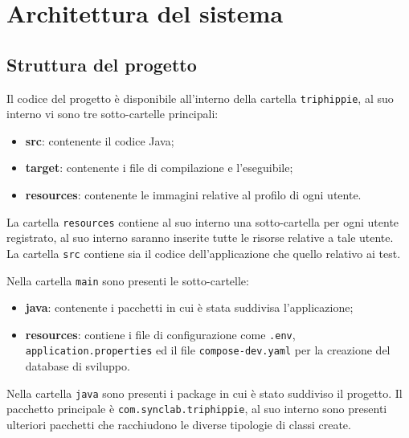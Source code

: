 \section{Architettura del sistema}

\subsection{Struttura del progetto}
Il codice del progetto è disponibile all'interno della cartella \texttt{triphippie}, al suo interno vi sono tre sotto-cartelle principali:
\begin{itemize}
    \item \textbf{src}: contenente il codice Java;
    \item \textbf{target}: contenente i file di compilazione e l'eseguibile;
    \item \textbf{resources}: contenente le immagini relative al profilo di ogni utente.
\end{itemize}
La cartella \texttt{resources} contiene al suo interno una sotto-cartella per ogni utente registrato, al suo interno saranno inserite tutte le risorse relative a tale utente.\\
La cartella \texttt{src} contiene sia il codice dell'applicazione che quello relativo ai test.

\begin{figure}[h]
    \centering
    \begin{minipage}{7cm}
    \end{minipage}
\end{figure}

\noindent
Nella cartella \texttt{main} sono presenti le sotto-cartelle:
\begin{itemize}
    \item \textbf{java}: contenente i pacchetti in cui è stata suddivisa l'applicazione;
    \item \textbf{resources}: contiene i file di configurazione come \texttt{.env}, \texttt{application.properties} ed il file \texttt{compose-dev.yaml} per la creazione del database di sviluppo.
\end{itemize} 
\begin{figure}[h]
    \centering
    \begin{minipage}{7cm}
    \end{minipage}
\end{figure}
\noindent
Nella cartella \texttt{java} sono presenti i package in cui è stato suddiviso il progetto.
Il pacchetto principale è \texttt{com.synclab.triphippie}, al suo interno sono presenti ulteriori pacchetti che racchiudono le diverse tipologie di classi create.

